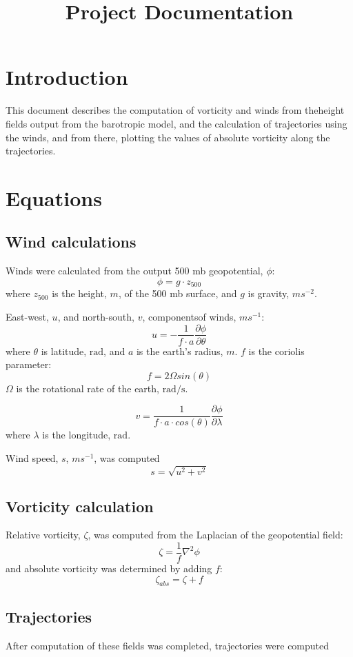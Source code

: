 \documentclass{article}
\begin{document}
\title{Project Documentation}
\section{Introduction}
This document describes the computation of vorticity and winds from theheight fields output from the barotropic model, and the calculation of trajectories using the winds, and from there, plotting the values of absolute vorticity along the trajectories.

\section{Equations}

\subsection{Wind calculations}
Winds were calculated from the output 500 mb geopotential, $\phi$:
\begin{equation}
  \phi = g \cdot z_{500}
\end{equation}
where $z_{500}$ is the height, $m$, of the 500 mb surface, and $g$ is
gravity, $ms^{-2}$.

East-west, $u$, and north-south, $v$, componentsof winds, $ms^{-1}$:
\begin{equation}
u  = - \frac{1}{f \cdot a}\frac{\partial \phi}{\partial \theta}
\end{equation}
where $\theta$ is latitude, $\text{rad}$, and $a$ is the earth's radius, $m$.
$f$ is the coriolis parameter:
\begin{equation}
  f = 2 \Omega sin(\theta)
\end{equation}
$\Omega$ is the rotational rate of the earth, $\text{rad/s}$.

\begin{equation}
v  =  \frac{1}{f \cdot a \cdot cos(\theta)}\frac{\partial \phi}{\partial \lambda}
\end{equation}
 where $\lambda$ is the longitude, $\text{rad}$.

Wind speed, $s$, $m s^{-1}$, was computed
 \begin{equation}
   s = \sqrt{u^2 + v^2}
   \end{equation}

\subsection{Vorticity calculation}
 Relative vorticity, $\zeta$, was computed from the Laplacian of the geopotential field:
 \begin{equation}
   \zeta = \frac{1}{f}\nabla^{2}\phi
 \end{equation}
 and absolute vorticity was determined by adding $f$:
 \begin{equation}
   \zeta_{abs} = \zeta + f
 \end{equation}
 
\subsection{Trajectories}
 After computation of these fields was completed, trajectories were computed
\end{document}

